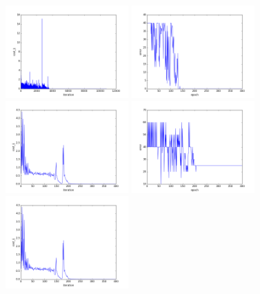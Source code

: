 \begin{figure}[htb]
\centering
\includegraphics[width=0.42\textwidth]{images/redes/ejecucion1/general_svm_frav_rgb_nir/cost.png}
\includegraphics[width=0.42\textwidth]{images/redes/ejecucion1/general_svm_frav_rgb_nir/error.png}
\includegraphics[width=0.42\textwidth]{images/redes/ejecucion1/general_svm_frav_rgb_nir/minidataset/cost.png}
\includegraphics[width=0.42\textwidth]{images/redes/ejecucion1/general_svm_frav_rgb_nir/minidataset/error.png}
\includegraphics[width=0.42\textwidth]{images/redes/ejecucion1/general_svm_frav_rgb_nir/minidataset_tested_itself/cost.png}

\end{figure}
